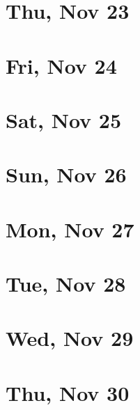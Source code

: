 	\section{Thu, Nov 23}
		
	\section{Fri, Nov 24}
		
	\section{Sat, Nov 25}
		
	\section{Sun, Nov 26}
		
	\section{Mon, Nov 27}
		
	\section{Tue, Nov 28}
		
	\section{Wed, Nov 29}
		
	\section{Thu, Nov 30}
		
